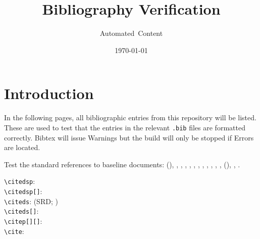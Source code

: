 \documentclass[DM,toc]{lsstdoc}
\title[Bib testing]{Bibliography Verification}
\author{Automated~Content}
\date{\today}
\begin{document}
\maketitle

\section{Introduction}

In the following pages, all bibliographic entries from this repository will be listed.
These are used to test that the entries in the relevant \texttt{.bib} files are formatted correctly.
Bibtex will issue Warnings but the build will only be stopped if Errors are located.

Test the standard references to baseline documents: (\SRD), \DPDD, \LSR, \OSS, \DMSR, \appsUMLdomain, \appsUMLusecase, \SUI, \DMSD, \MOPSD, \DMMD, \DMOps, (\SDQAP), \NewPCP, \UCAL.

\verb|\citedsp|:  \\
\verb|\citedsp[]|:  \\
\verb|\citeds|: (SRD; ) \\
\verb|\citeds[]|:  \\
\verb|\citep[][]|: \citep[e.g.,][are interesting]{LPM-17,LSE-29} \\
\verb|\cite|: \cite{LPM-17,LSE-29}

\nocite{*}


\end{document}
